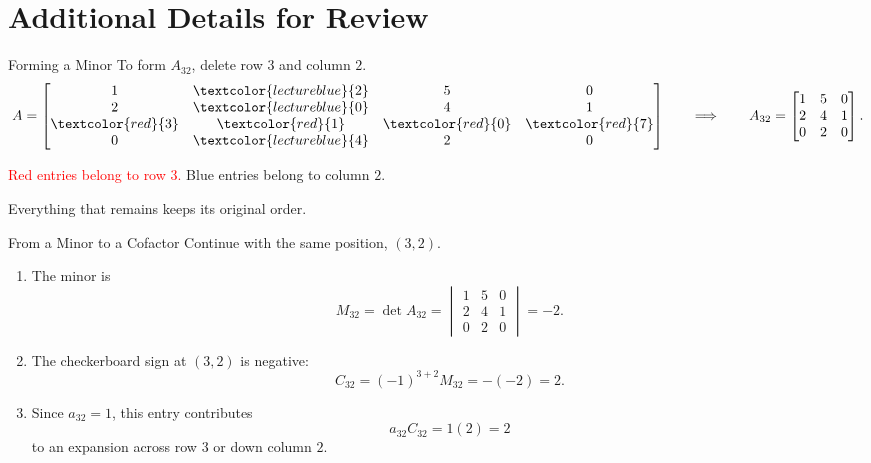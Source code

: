 \section[Review additions]{Additional Details for Review}

\begin{frame}{Forming a Minor}
To form $A_{32}$, delete row $3$ and column $2$.
\[
A=\begin{bmatrix}
1&\textcolor{lectureblue}{2}&5&0\\
2&\textcolor{lectureblue}{0}&4&1\\
\textcolor{red}{3}&\textcolor{red}{1}&\textcolor{red}{0}&\textcolor{red}{7}\\
0&\textcolor{lectureblue}{4}&2&0
\end{bmatrix}
\qquad\Longrightarrow\qquad
A_{32}=\begin{bmatrix}
1&5&0\\
2&4&1\\
0&2&0
\end{bmatrix}.
\]
\begin{center}
\textcolor{red}{Red entries belong to row $3$.}
\qquad
\textcolor{lectureblue}{Blue entries belong to column $2$.}
\end{center}
\pause
Everything that remains keeps its original order.
\end{frame}

\begin{frame}{From a Minor to a Cofactor}
Continue with the same position, $(3,2)$.
\begin{enumerate}
  \item The minor is
  \[
  M_{32}=\det A_{32}
  =\begin{vmatrix}1&5&0\\2&4&1\\0&2&0\end{vmatrix}=-2.
  \]
  \pause
  \item The checkerboard sign at $(3,2)$ is negative:
  \[
  C_{32}=(-1)^{3+2}M_{32}=-(-2)=2.
  \]
  \pause
  \item Since $a_{32}=1$, this entry contributes
  \[
  a_{32}C_{32}=1(2)=2
  \]
  to an expansion across row $3$ or down column $2$.
\end{enumerate}
\end{frame}


